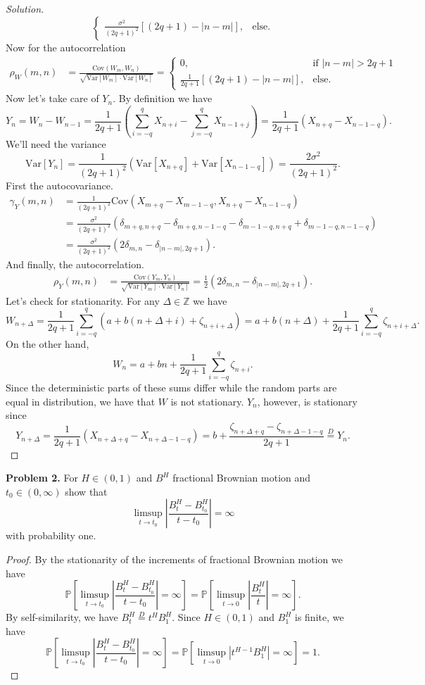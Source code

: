 \documentclass[11pt,letterpaper]{report}
\newcommand{\integers}{\mathbb{Z}}
\newcommand{\Prob}{\mathbb{P}}
\newcommand{\Var}{\text{Var}}
\newcommand{\Cov}{\text{Cov}}
\newenvironment{solution}
{\begin{proof}[Solution]}
{\end{proof}}
\begin{document}
\begin{solution}
\[\begin{cases}
		\frac{\sigma^2}{(2q+1)^2}[(2q+1) - |n-m|],&\text{else}.
	\end{cases}
	\]
	Now for the autocorrelation
	\begin{align*}
		\rho_W(m,n) &= \frac{\Cov(W_m, W_n)}{\sqrt{\Var[W_m]\cdot \Var[W_n]}} = \begin{cases}
		0,&\text{if }|n-m|> 2q+1\\
		\frac{1}{2q+1}[(2q+1) - |n-m|],&\text{else}.
		\end{cases}
	\end{align*}
	Now let's take care of $Y_n$. By definition we have
	\[
	Y_n = W_n - W_{n-1} = \frac{1}{2q+1}\left(\sum_{i=-q}^qX_{n+i} - \sum_{j=-q}^qX_{n-1+j}\right) = \frac{1}{2q+1}(X_{n+q} - X_{n-1-q}).
	\]
	We'll need the variance
	\[
	\Var[Y_n] = \frac{1}{(2q+1)^2}(\Var[X_{n+q}] + \Var[X_{n-1-q}]) = \frac{2\sigma^2}{(2q+1)^2}.
	\]
	First the autocovariance.
	\begin{align*}
		\gamma_Y(m,n) &= \frac{1}{(2q+1)^2}\Cov(X_{m+q} - X_{m-1-q}, X_{n+q} - X_{n-1-q})\\
		&= \frac{\sigma^2}{(2q+1)^2}(\delta_{m+q, n+q} - \delta_{m+q, n-1-q} - \delta_{m-1-q, n+q} + \delta_{m-1-q, n-1-q})\\
		&= \frac{\sigma^2}{(2q+1)^2}(2\delta_{m,n} - \delta_{|n-m|, 2q+1}).
	\end{align*}
	And finally, the autocorrelation.
	\begin{align*}
		\rho_Y(m,n) &= \frac{\Cov(Y_m, Y_n)}{\sqrt{\Var[Y_m]\cdot \Var[Y_n]}} = \frac{1}{2}(2\delta_{m,n} - \delta_{|n-m|, 2q+1}).
	\end{align*}
	Let's check for stationarity. For any $\Delta\in \integers$ we have
	\[
	W_{n+\Delta} = \frac{1}{2q+1}\sum_{i = -q}^q(a + b(n+\Delta + i) + \zeta_{n+i+\Delta}) = a +b(n+\Delta) + \frac{1}{2q+1}\sum_{i=-q}^q\zeta_{n+i+\Delta}.
	\]
	On the other hand,
	\[
	W_n = a + bn + \frac{1}{2q+1}\sum_{i=-q}^q\zeta_{n+i}.
	\]
	Since the deterministic parts of these sums differ while the random parts are equal in distribution, we have that $W$ is not stationary. $Y_n$, however, is stationary since
	\[
	Y_{n+\Delta} = \frac{1}{2q+1}(X_{n+\Delta+q} - X_{n+\Delta-1-q}) = b + \frac{\zeta_{n+\Delta+q} - \zeta_{n+\Delta-1-q}}{2q+1} \overset{D}{=}Y_n.
	\]
\end{solution}

\noindent\textbf{Problem 2. }
For $H\in (0,1)$ and $B^H$ fractional Brownian motion and $t_0\in (0, \infty)$ show that
\[
\limsup_{t\to t_0}\left|\frac{B_t^H - B_{t_0}^H}{t-t_0}\right| = \infty
\]
with probability one.
\begin{proof}
	By the stationarity of the increments of fractional Brownian motion we have
	\[
	\Prob\left[\limsup_{t\to t_0}\left|\frac{B^H_t - B^H_{t_0}}{t-t_0}\right|=\infty\right] = \Prob\left[\limsup_{t\to 0}\left|\frac{B_t^H}{t}\right|=\infty\right].
	\]
	By self-similarity, we have $B_t^H \overset{D}{=}t^HB^H_1$. Since $H\in (0,1)$ and $B^H_1$ is finite, we have
	\[
	\Prob\left[\limsup_{t\to t_0}\left|\frac{B^H_t - B^H_{t_0}}{t-t_0}\right|=\infty\right] = \Prob\left[\limsup_{t\to 0}|t^{H-1}B_1^H| = \infty\right] = 1.
	\]
\end{proof}
\end{document}
